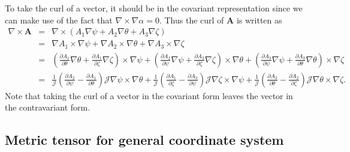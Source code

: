 \documentclass{article}
\begin{document}
To take the curl of a vector, it should be in the covariant representation
since we can make use of the fact that $\nabla \times \nabla \alpha = 0$. Thus
the curl of $\mathbf{A}$ is written as
\begin{eqnarray}
  \nabla \times \mathbf{A} & = & \nabla \times (A_1 \nabla \psi + A_2 \nabla
  \theta + A_3 \nabla \zeta) \nonumber\\
  & = & \nabla A_1 \times \nabla \psi + \nabla A_2 \times \nabla \theta +
  \nabla A_3 \times \nabla \zeta \nonumber\\
  & = & \left( \frac{\partial A_1}{\partial \theta} \nabla \theta +
  \frac{\partial A_1}{\partial \zeta} \nabla \zeta \right) \times \nabla \psi
  + \left( \frac{\partial A_2}{\partial \psi} \nabla \psi + \frac{\partial
  A_2}{\partial \zeta} \nabla \zeta \right) \times \nabla \theta + \left(
  \frac{\partial A_3}{\partial \psi} \nabla \psi + \frac{\partial
  A_3}{\partial \theta} \nabla \theta \right) \times \nabla \zeta \nonumber\\
  & = & \frac{1}{\mathcal{J}} \left( \frac{\partial A_2}{\partial \psi} -
  \frac{\partial A_1}{\partial \theta} \right) \mathcal{J} \nabla \psi \times
  \nabla \theta + \frac{1}{\mathcal{J}} \left( \frac{\partial A_1}{\partial
  \zeta} - \frac{\partial A_3}{\partial \psi} \right) \mathcal{J} \nabla \zeta
  \times \nabla \psi + \frac{1}{\mathcal{J}} \left( \frac{\partial
  A_3}{\partial \theta} - \frac{\partial A_2}{\partial \zeta} \right)
  \mathcal{J} \nabla \theta \times \nabla \zeta .  \label{4-16-2}
\end{eqnarray}
Note that taking the curl of a vector in the covariant form leaves the vector
in the contravariant form.

\subsection{Metric tensor for general coordinate system}
\end{document}
